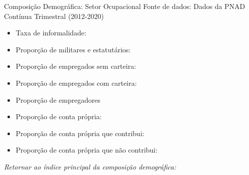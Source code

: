 \begin{frame}[label=_composicao_demografica_setor]{Composição Demográfica: Setor Ocupacional}
{\footnotesize Fonte de dados: Dados da PNAD Contínua Trimestral (2012-2020)}
\begin{itemize}
\item{Taxa de informalidade: \hyperlink{_composicao_demografica_setor_taxa_de_informalidade}{}}
\item{Proporção de militares e estatutários: \hyperlink{_composicao_demografica_setor_prop_militar}{}}
\item{Proporção de empregados sem carteira: \hyperlink{_composicao_demografica_setor_prop_empregadoSC}{}}
\item{Proporção de empregados com carteira: \hyperlink{_composicao_demografica_setor_prop_empregadoCC}{}}
\item{Proporção de empregadores \hyperlink{_composicao_demografica_setor_prop_empregador}{}}
\item{Proporção de conta própria: \hyperlink{_composicao_demografica_setor_prop_cpropria}{}}
\item{Proporção de conta própria que contribui: \hyperlink{_composicao_demografica_setor_prop_cpropriaC}{}}
\item{Proporção de conta própria que não contribui: \hyperlink{_composicao_demografica_setor_prop_cpropriaNc}{}}
\end{itemize}

\begin{small}
\textit{Retornar ao índice principal da composição demográfica: \hyperlink{_composicao_demografica}{} }
\end{small}

\end{frame}


